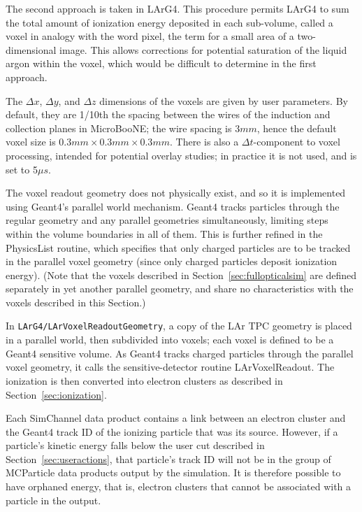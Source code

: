 \documentclass[12pt]{elsarticle}
\begin{document}
The second approach is taken in LArG4. This procedure permits LArG4 to
sum the total amount of ionization energy deposited in each
sub-volume, called a voxel in analogy with the word pixel, the
term for a small area of a two-dimensional image. This allows
corrections for potential saturation of the liquid argon within the
voxel, which would be difficult to determine in the first approach.

The ${\Delta}x$, ${\Delta}y$, and ${\Delta}z$ dimensions of the voxels
are given by user parameters. By default, they are 1/10th the spacing
between the wires of the induction and collection planes in
MicroBooNE; the wire spacing is 3$mm$, hence the default voxel size is
$0.3mm\times0.3mm\times0.3mm$. There is also a ${\Delta}t$-component
to voxel processing, intended for potential overlay studies; in
practice it is not used, and is set to 5${\mu}s$.

The voxel readout geometry does not physically exist, and so it is
implemented using Geant4's parallel world mechanism. Geant4 tracks
particles through the regular geometry and any parallel geometries
simultaneously, limiting steps within the volume boundaries in all of
them. This is further refined in the PhysicsList routine,
which specifies that only charged particles are to be tracked in the
parallel voxel geometry (since only charged particles deposit
ionization energy). (Note that the voxels described in 
Section~\ref{sec:fullopticalsim} are defined separately in yet another
parallel geometry, and share no characteristics with the voxels
described in this Section.)

In {\tt LArG4/LArVoxelReadoutGeometry}, a copy of the LAr TPC geometry
is placed in a parallel world, then subdivided into voxels; each voxel
is defined to be a Geant4 sensitive volume. As Geant4 tracks charged
particles through the parallel voxel geometry, it calls the
sensitive-detector routine LArVoxelReadout. The ionization
is then converted into electron clusters as described in
Section~\ref{sec:ionization}.

Each SimChannel
data product contains a link between an electron cluster and the
Geant4 track ID of the ionizing particle that was its source. However,
if a particle's kinetic energy falls below the user cut described in
Section~\ref{sec:useractions}, that particle's track ID will not be in
the group of MCParticle data products output by the
simulation. It is therefore possible to have orphaned energy, that
is, electron clusters that cannot be associated with a particle in the
output. 
\end{document}
